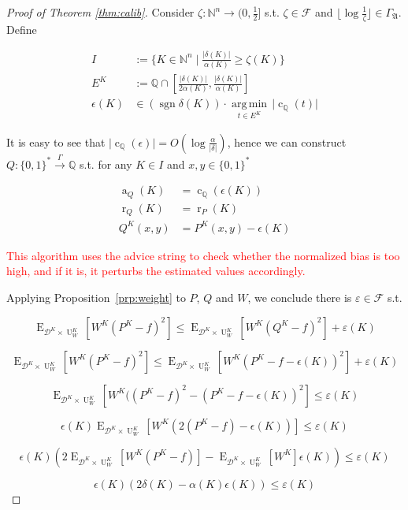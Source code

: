 \documentclass[11pt]{article}
\numberwithin{equation}{section}
\theoremstyle{definition}
\theoremstyle{plain}
\newcommand{\Bool}{\{0,1\}}
\newcommand{\Words}{{\Bool^*}}
\DeclareMathOperator{\Sgn}{sgn}
\DeclareMathOperator{\E}{E}
\DeclareMathOperator{\R}{r}
\DeclareMathOperator{\A}{a}
\DeclareMathOperator{\Un}{U}
\DeclareMathOperator{\En}{c}
\newcommand{\Argmin}[1]{\underset{#1}{\operatorname{arg\,min}}\,}
\newcommand{\Nats}{\mathbb{N}}
\newcommand{\Rats}{\mathbb{Q}}
\newcommand{\NatFun}{\Nats^n \rightarrow}
\newcommand{\Abs}[1]{\lvert #1 \rvert}
\newcommand{\Floor}[1]{\lfloor #1 \rfloor}
\newcommand{\Dist}{\mathcal{D}}
\newcommand{\GrowA}{\Gamma_{\mathfrak{A}}}
\newcommand{\Fall}{\mathcal{F}}
\newcommand{\Scheme}{\xrightarrow{\Gamma}}
\begin{document}
\begin{proof}[Proof of Theorem \ref{thm:calib}]

Consider $\zeta: \NatFun (0,\frac{1}{2}]$ s.t.  $\zeta \in \Fall$ and $\Floor{\log \frac{1}{\zeta}} \in \GrowA$. Define 

\begin{align*}
I&:=\{K \in \Nats^n \mid \frac{\Abs{\delta(K)}}{\alpha(K)} \geq \zeta(K)\} \\
E^{K}&:=\Rats \cap \left[\frac{\Abs{\delta(K)}}{2\alpha(K)},\frac{\Abs{\delta(K)}}{\alpha(K)}\right] \\
\epsilon(K) &\in (\Sgn \delta(K)) \cdot \Argmin{t \in E^{K}} \Abs{\En_\Rats(t)}
\end{align*}

It is easy to see that ${\Abs{\En_\Rats(\epsilon)} = O(\log \frac{\alpha}{\Abs{\delta}})}$, hence we can construct $Q: \Words \Scheme \Rats$ s.t. for any $K \in I$ and $x,y \in \Words$

\begin{align*}
\A_Q(K) &= \En_\Rats(\epsilon(K)) \\
\R_Q(K) &= \R_P(K) \\
Q^{K}(x,y) &= P^{K}(x,y)-\epsilon(K)
\end{align*}

\textcolor{red}{This algorithm uses the advice string to check whether the normalized bias is too high, and if it is, it perturbs the estimated values accordingly.}

Applying Proposition~\ref{prp:weight} to $P$, $Q$ and $W$, we conclude there is $\varepsilon \in \Fall$ s.t.

$$\E_{\Dist^{K} \times \Un_W^{K}}[W^{K}(P^{K} - f)^2] \leq \E_{\Dist^{K} \times \Un_W^{K}}[W^{K}(Q^{K}-f)^2] + \varepsilon(K)$$

$$\E_{\Dist^{K} \times \Un_W^{K}}[W^{K}(P^{K} - f)^2] \leq \E_{\Dist^{K} \times \Un_W^{K}}[W^{K}(P^{K}-f-\epsilon(K))^2] + \varepsilon(K)$$

$$\E_{\Dist^{K} \times \Un_W^{K}}[W^{K}((P^{K} - f)^2 - (P^{K}-f-\epsilon(K))^2] \leq \varepsilon(K)$$

$$ \epsilon(K) \E_{\Dist^{K} \times \Un_W^{K}}[W^{K}(2(P^{K} - f) - \epsilon(K))] \leq \varepsilon(K)$$

$$ \epsilon(K) (2 \E_{\Dist^{K} \times \Un_W^{K}}[W^{K}(P^{K} - f)]-\E_{\Dist^{K} \times \Un_W^{K}}[W^{K}]\epsilon(K)) \leq \varepsilon(K)$$

$$ \epsilon(K) (2 \delta(K) - \alpha(K)\epsilon(K)) \leq \varepsilon(K)$$


\end{proof}
\end{document}
